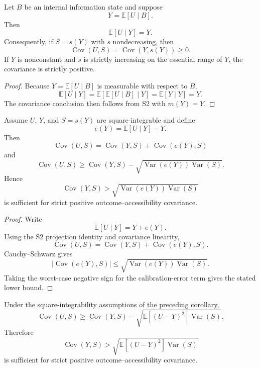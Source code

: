 \begin{corollary}
Let $B$ be an internal information state and suppose
\[
Y=\mathbb E[U\mid B].
\]
Then
\[
\mathbb E[U\mid Y]=Y.
\]
Consequently, if $S=s(Y)$ with $s$ nondecreasing, then
\[
\operatorname{Cov}(U,S)
=
\operatorname{Cov}(Y,s(Y))
\ge0.
\]
If $Y$ is nonconstant and $s$ is strictly increasing on the essential range of $Y$, the covariance is strictly positive.
\end{corollary}

\begin{proof}
Because $Y=\mathbb E[U\mid B]$ is measurable with respect to $B$,
\[
\mathbb E[U\mid Y]
=
\mathbb E[\mathbb E[U\mid B]\mid Y]
=
\mathbb E[Y\mid Y]
=Y.
\]
The covariance conclusion then follows from S2 with $m(Y)=Y$.
\end{proof}

\begin{corollary}
Assume $U$, $Y$, and $S=s(Y)$ are square-integrable and define
\[
e(Y)=\mathbb E[U\mid Y]-Y.
\]
Then
\[
\operatorname{Cov}(U,S)
=
\operatorname{Cov}(Y,S)
+
\operatorname{Cov}(e(Y),S)
\]
and
\[
\operatorname{Cov}(U,S)
\ge
\operatorname{Cov}(Y,S)
-
\sqrt{\operatorname{Var}(e(Y))\operatorname{Var}(S)}.
\]
Hence
\[
\operatorname{Cov}(Y,S)
>
\sqrt{\operatorname{Var}(e(Y))\operatorname{Var}(S)}
\]
is sufficient for strict positive outcome--accessibility covariance.
\end{corollary}

\begin{proof}
Write
\[
\mathbb E[U\mid Y]=Y+e(Y).
\]
Using the S2 projection identity and covariance linearity,
\[
\operatorname{Cov}(U,S)
=
\operatorname{Cov}(Y,S)
+
\operatorname{Cov}(e(Y),S).
\]
Cauchy--Schwarz gives
\[
|\operatorname{Cov}(e(Y),S)|
\le
\sqrt{\operatorname{Var}(e(Y))\operatorname{Var}(S)}.
\]
Taking the worst-case negative sign for the calibration-error term gives the stated lower bound.
\end{proof}

\begin{corollary}
Under the square-integrability assumptions of the preceding corollary,
\[
\operatorname{Cov}(U,S)
\ge
\operatorname{Cov}(Y,S)
-
\sqrt{\mathbb E[(U-Y)^2]\operatorname{Var}(S)}.
\]
Therefore
\[
\operatorname{Cov}(Y,S)
>
\sqrt{\mathbb E[(U-Y)^2]\operatorname{Var}(S)}
\]
is sufficient for strict positive outcome--accessibility covariance.
\end{corollary}

